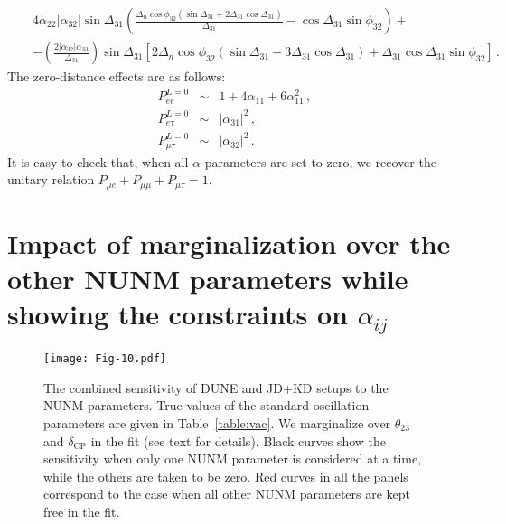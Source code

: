 \documentclass[11pt,a4paper]{article}
\newcommand{\capdef}{}
\newcommand{\mycaption}[2][\capdef]{\renewcommand{\capdef}{#2}
	\caption[#1]{{\footnotesize #2}}}
\begin{document}
\begin{appendix}
\begin{eqnarray}
&&4 \alpha_{22} |\alpha_{32}| \sin\Delta_{31} \left(\frac{\Delta_n   \cos\phi_{32} (\sin\Delta_{31}+2 \Delta_{31} \cos\Delta_{31})}{\Delta_{31}}-\cos \Delta_{31} \sin\phi_{32}\right) + \nonumber \\
&& -\left(\frac{2 |\alpha_{32}| \alpha_{33}}{\Delta_{31}}\right) \sin\Delta_{31} \left[2 \Delta_{n} \cos\phi_{32} (\sin\Delta_{31}-3 \Delta_{31} \cos \Delta_{31})+\Delta_{31} \cos\Delta_{31}\sin\phi _{32}\right]\,.
\label{tauprob}
\end{eqnarray}
The zero-distance effects are as follows:
\begin{eqnarray}
	\label{eq:zero-distance}
P_{e e}^{L = 0} &\sim& 1 + 4 \alpha_{11} + 6 \alpha_{11}^2 \,, \nonumber \\
P_{e\tau}^{L = 0} &\sim&  |\alpha_{31}|^2\,,\\
P_{\mu\tau}^{L = 0} &\sim&  |\alpha_{32}|^2\,.\nonumber 
\end{eqnarray}
It is easy to check that, when all $\alpha$ parameters are set to zero, we recover the unitary relation $P_{\mu e}+P_{\mu \mu}+P_{\mu \tau}=1$.


\renewcommand\thefigure{B\arabic{figure}}
\renewcommand\thetable{B\arabic{table}}
\renewcommand\theequation{B\arabic{equation}}
\setcounter{figure}{0} 
\setcounter{table}{0}
\setcounter{equation}{0}

\section{Impact of marginalization over the  other NUNM parameters while showing the constraints on $\alpha_{ij}$}
\label{sec:NU_marg}

 \begin{figure*}[h!]
 	\centering
 	\texttt{[image: Fig-10.pdf]}
 	\mycaption{The combined sensitivity of DUNE and JD+KD setups to the NUNM parameters. True values of the standard oscillation parameters are given in Table~\ref{table:vac}. We marginalize over $\theta_{23}$ and $\delta_{\mathrm{CP}}$ in the fit (see text for details). Black curves show the sensitivity when only one NUNM parameter is considered at a time, while the others are taken to be zero. Red curves in all the panels correspond to the case when all other NUNM parameters are kept free in the fit.  \label{fig:NU-param-marg}} 
 \end{figure*}
 

\end{appendix}
\end{document}
